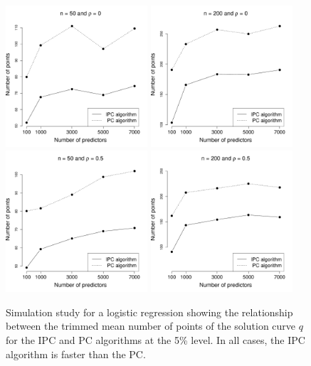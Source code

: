 \begin{figure}[t!]
	{\includegraphics[width=0.47\textwidth]{n50_rho0.pdf}}
	{\includegraphics[width=0.47\textwidth]{n200_rho0.pdf}}
	{\includegraphics[width=0.47\textwidth]{n50_rho05.pdf}}
	{\includegraphics[width=0.47\textwidth]{n200_rho05.pdf}}
	\caption{Simulation study for a logistic regression showing the relationship between the trimmed mean number of points of the solution curve $q$ for the IPC and PC algorithms at the 5\% level. In all cases, the IPC algorithm is faster than the PC.}
	\label{fig:cpu}
\end{figure}



